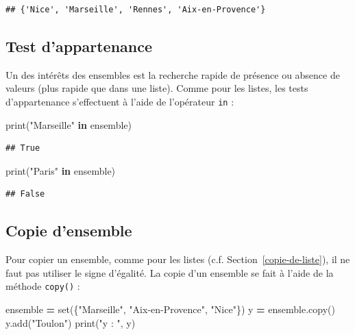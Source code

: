\documentclass[12pt,]{book}
\newenvironment{Shaded}{\begin{snugshade}}{\end{snugshade}}
\newcommand{\KeywordTok}[1]{\textcolor[rgb]{0.13,0.29,0.53}{\textbf{#1}}}
\newcommand{\StringTok}[1]{\textcolor[rgb]{0.31,0.60,0.02}{#1}}
\newcommand{\OperatorTok}[1]{\textcolor[rgb]{0.81,0.36,0.00}{\textbf{#1}}}
\newcommand{\BuiltInTok}[1]{#1}
\newcommand{\NormalTok}[1]{#1}
\numberwithin{equation}{section}
\numberwithin{countremarque}{section}
\begin{document}
\begin{lstlisting}
## {'Nice', 'Marseille', 'Rennes', 'Aix-en-Provence'}
\end{lstlisting}

\subsection{Test d'appartenance}\label{test-dappartenance-1}

Un des intérêts des ensembles est la recherche rapide de présence ou
absence de valeurs (plus rapide que dans une liste). Comme pour les
listes, les tests d'appartenance s'effectuent à l'aide de l'opérateur
\texttt{in} :

\begin{Shaded}
\begin{Highlighting}[]
\BuiltInTok{print}\NormalTok{(}\StringTok{"Marseille"} \KeywordTok{in}\NormalTok{ ensemble)}
\end{Highlighting}
\end{Shaded}

\begin{lstlisting}
## True
\end{lstlisting}

\begin{Shaded}
\begin{Highlighting}[]
\BuiltInTok{print}\NormalTok{(}\StringTok{"Paris"} \KeywordTok{in}\NormalTok{ ensemble)}
\end{Highlighting}
\end{Shaded}

\begin{lstlisting}
## False
\end{lstlisting}

\subsection{Copie d'ensemble}\label{copie-densemble}

Pour copier un ensemble, comme pour les listes (c.f.
Section~\ref{copie-de-liste}), il ne faut pas utiliser le signe
d'égalité. La copie d'un ensemble se fait à l'aide de la méthode
\texttt{copy()} :

\begin{Shaded}
\begin{Highlighting}[]
\NormalTok{ensemble }\OperatorTok{=} \BuiltInTok{set}\NormalTok{(\{}\StringTok{"Marseille"}\NormalTok{, }\StringTok{"Aix-en-Provence"}\NormalTok{, }\StringTok{"Nice"}\NormalTok{\})}
\NormalTok{y }\OperatorTok{=}\NormalTok{ ensemble.copy()}
\NormalTok{y.add(}\StringTok{"Toulon"}\NormalTok{)}
\BuiltInTok{print}\NormalTok{(}\StringTok{"y : "}\NormalTok{, y)}
\end{Highlighting}
\end{Shaded}
\end{document}
